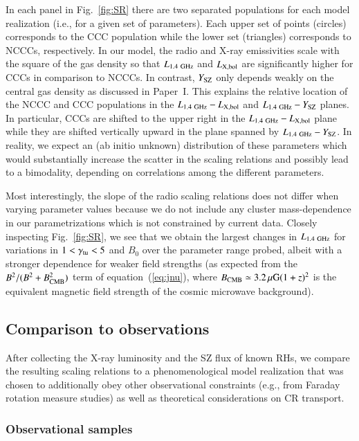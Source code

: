 \documentclass[useAMS,usenatbib]{mn2e}
\begin{document}
In each panel in Fig.~\ref{fig:SR} there are two separated populations for
each model realization (i.e., for a given set of parameters). Each upper set of
points (circles) corresponds to the CCC population while the lower set (triangles) 
corresponds to NCCCs, respectively. In our model, the radio and X-ray emissivities scale 
with the square of the gas density so that $L_{1.4~{\mathrm{GHz}}}$ and $L_{{\mathrm{X,bol}}}$
are significantly higher for CCCs in comparison to NCCCs. In contrast,
$Y_{{\mathrm{SZ}}}$ only depends weakly on the central gas density as discussed in
Paper~I. This explains the relative location of the NCCC and
CCC populations in the $L_{1.4~{\mathrm{GHz}}}-L_{{\mathrm{X,bol}}}$ and
$L_{1.4~{\mathrm{GHz}}}-Y_{{\mathrm{SZ}}}$ planes. In particular, CCCs are shifted to the
upper right in the $L_{1.4~{\mathrm{GHz}}}-L_{{\mathrm{X,bol}}}$ plane while they are
shifted vertically upward in the plane spanned by
$L_{1.4~{\mathrm{GHz}}}-Y_{{\mathrm{SZ}}}$. In reality, we expect an (ab initio unknown)
distribution of these parameters which would substantially increase the scatter
in the scaling relations and possibly lead to a bimodality, depending on
correlations among the different parameters.

Most interestingly, the slope of the radio scaling relations does not differ
when varying parameter values because we do not include any cluster
mass-dependence in our parametrizations which is not constrained by current
data. Closely inspecting Fig.~\ref{fig:SR}, we see that we obtain the largest
changes in $L_{1.4~{\mathrm{GHz}}}$ for variations in $1<\gamma_{{\mathrm{tu}}}<5$ and
$B_0$ over the parameter range probed, albeit with a stronger dependence for
weaker field strengths (as expected from the $B^2/(B^2+B_{\mathrm{CMB}}^2)$ term of
equation~(\ref{eq:jnu}), where $B_{\mathrm{CMB}}\simeq 3.2\,\mu{\mathrm{G}} (1+z)^2$ is
the equivalent magnetic field strength of the cosmic microwave background).


\subsection{Comparison to observations}
\label{sec:scaling-obs}
 
After collecting the X-ray luminosity and the SZ flux of known RHs, we compare
the resulting scaling relations to a phenomenological model realization that was
chosen to additionally obey other observational constraints (e.g., from Faraday
rotation measure studies) as well as theoretical considerations on CR transport.

\subsubsection{Observational samples}
\end{document}

